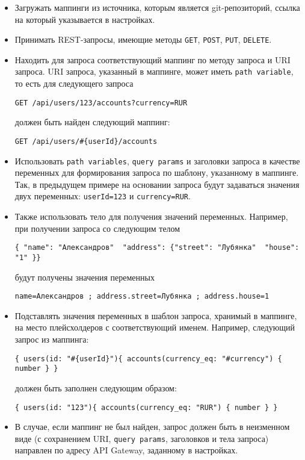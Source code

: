 \begin{itemize}
    \item Загружать маппинги из источника, которым является git-репозиторий, ссылка на который указывается в настройках.

    \item Принимать REST-запросы, имеющие методы \texttt{GET}, \texttt{POST}, \texttt{PUT}, \texttt{DELETE}.

    \item Находить для запроса соответствующий маппинг по методу запроса и URI запроса.
    URI запроса, указанный в маппинге, может иметь \texttt{path variable}, то есть для следующего запроса

    \texttt{GET /api/users/123/accounts?currency=RUR}

    должен быть найден следующий маппинг:

    \texttt{GET /api/users/\#\{userId\}/accounts}

    \item Использовать \texttt{path variables}, \texttt{query params} и заголовки запроса в качестве переменных для формирования запроса по шаблону, указанному в маппинге.
    Так, в предыдущем примере на основании запроса будут задаваться значения двух переменных: \texttt{userId=123} и \texttt{currency=RUR}.

    \item Также использовать тело для получения значений переменных.
    Например, при получении запроса со следующим телом

    \texttt{\{ "name": "Александров"\, "address": \{"street": "Лубянка"\, "house": "1" \}\}}

    будут получены значения переменных

    \texttt{name=Александров ; address.street=Лубянка ; address.house=1}

    \item Подставлять значения переменных в шаблон запроса, хранимый в маппинге, на место плейсхолдеров с соответствующий именем.
    Например, следующий запрос из маппинга:

    \texttt{\{ users(id: "\#\{userId\}")\{ accounts(currency\_eq: "\#{currency}") \{ number \} \}}

    должен быть заполнен следующим образом:

    \texttt{\{ users(id: "123")\{ accounts(currency\_eq: "RUR") \{ number \} \}}

    \item В случае, если маппинг не был найден, запрос должен быть в неизменном виде (с сохранением URI, \texttt{query params}, заголовков и тела запроса) направлен по адресу API Gateway, заданному в настройках.


\end{itemize}
